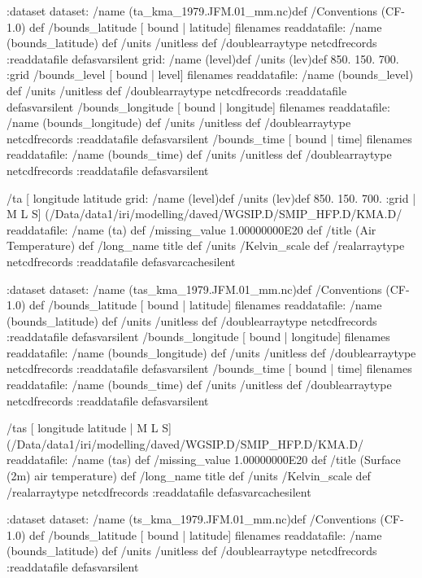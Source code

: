 :dataset
dataset:
/name (ta_kma_1979.JFM.01_mm.nc)def
 /Conventions (CF-1.0) def
 /bounds_latitude{
[ bound | latitude] filenames readdatafile:
/name (bounds_latitude) def
 /units /unitless def
 /doublearraytype netcdfrecords :readdatafile
}defasvarsilent
grid:
/name (level)def
/units (lev)def
 850. 150. 700.
:grid
 /bounds_level{
[ bound | level] filenames readdatafile:
/name (bounds_level) def
 /units /unitless def
 /doublearraytype netcdfrecords :readdatafile
}defasvarsilent
 /bounds_longitude{
[ bound | longitude] filenames readdatafile:
/name (bounds_longitude) def
 /units /unitless def
 /doublearraytype netcdfrecords :readdatafile
}defasvarsilent
 /bounds_time{
[ bound | time] filenames readdatafile:
/name (bounds_time) def
 /units /unitless def
 /doublearraytype netcdfrecords :readdatafile
}defasvarsilent
\begin{ingrid}
 /ta{
[ longitude latitude 
grid:
/name (level)def
/units (lev)def
 850. 150. 700.
:grid
| M L S]
(/Data/data1/iri/modelling/daved/WGSIP.D/SMIP_HFP.D/KMA.D/%
 readdatafile:
/name (ta) def
 /missing_value 1.00000000E20 def
 /title (Air Temperature) def
 /long_name title def /units /Kelvin_scale def
 /realarraytype netcdfrecords :readdatafile
}defasvarcachesilent
\end{ingrid}
:dataset
dataset:
/name (tas_kma_1979.JFM.01_mm.nc)def
 /Conventions (CF-1.0) def
 /bounds_latitude{
[ bound | latitude] filenames readdatafile:
/name (bounds_latitude) def
 /units /unitless def
 /doublearraytype netcdfrecords :readdatafile
}defasvarsilent
 /bounds_longitude{
[ bound | longitude] filenames readdatafile:
/name (bounds_longitude) def
 /units /unitless def
 /doublearraytype netcdfrecords :readdatafile
}defasvarsilent
 /bounds_time{
[ bound | time] filenames readdatafile:
/name (bounds_time) def
 /units /unitless def
 /doublearraytype netcdfrecords :readdatafile
}defasvarsilent
\begin{ingrid}
 /tas{
[ longitude latitude | M L S]
(/Data/data1/iri/modelling/daved/WGSIP.D/SMIP_HFP.D/KMA.D/%
 readdatafile:
/name (tas) def
 /missing_value 1.00000000E20 def
 /title (Surface (2m) air temperature) def
 /long_name title def /units /Kelvin_scale def
 /realarraytype netcdfrecords :readdatafile
}defasvarcachesilent
\end{ingrid}
:dataset
dataset:
/name (ts_kma_1979.JFM.01_mm.nc)def
 /Conventions (CF-1.0) def
 /bounds_latitude{
[ bound | latitude] filenames readdatafile:
/name (bounds_latitude) def
 /units /unitless def
 /doublearraytype netcdfrecords :readdatafile
}defasvarsilent
